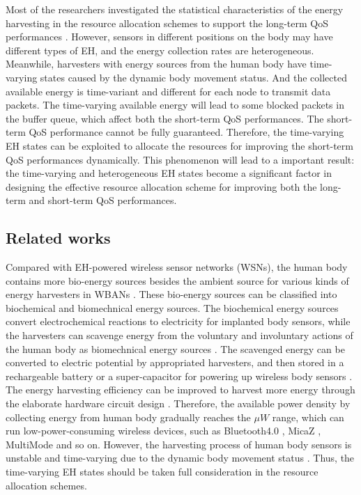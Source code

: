 \documentclass[journal,10pt]{IEEEtran}
\begin{document}
Most of the researchers investigated the statistical characteristics of the energy harvesting in the resource allocation schemes to support the long-term QoS performances \cite{ibarra2016qos,ozel2011transmission,leng2017resource}. 
However, sensors in different positions on the body may have different types of EH, and the energy collection rates are heterogeneous. Meanwhile, harvesters with energy sources from the human body have time-varying states caused by the dynamic body movement status. And the collected available energy is time-variant and different for each node to transmit data packets. 
The time-varying available energy will lead to some blocked packets in the buffer queue, which affect both the short-term QoS performances. The short-term QoS performance cannot be fully guaranteed.
Therefore, the time-varying EH states can be exploited to allocate the resources for improving the short-term QoS performances dynamically. This phenomenon will lead to a important result: the time-varying and heterogeneous EH states become a significant factor in designing the effective resource allocation scheme for improving both the long-term and short-term QoS performances. 

\subsection{Related works}
Compared with EH-powered wireless sensor networks (WSNs), the human body contains more bio-energy sources besides the ambient source for various kinds of energy harvesters in WBANs \cite{leng2017resource}. These bio-energy sources can be classified into biochemical and biomechnical energy sources. The biochemical energy sources convert electrochemical reactions to electricity for implanted body sensors, while the harvesters can scavenge energy from the voluntary and involuntary actions of the human body as biomechnical energy sources \cite{akhtar2017energy}. The scavenged energy can be converted to electric potential by appropriated harvesters, and then stored in a rechargeable battery or a super-capacitor for powering up wireless body sensors \cite{wahbah2014characterization}. The energy harvesting efficiency can be improved to harvest more energy through the elaborate hardware circuit design \cite{xia20140,el201610}. Therefore, the available power density by collecting energy from human body gradually reaches the $\mu W$ range, which can run low-power-consuming wireless devices, such as Bluetooth4.0 \cite{bluetooth2010}, MicaZ \cite{kramer2006energy}, MultiMode \cite{wong20131} and so on. However, the harvesting process of human body sensors is unstable and time-varying due to the dynamic body movement status \cite{hao2017energy}. Thus, the time-varying EH states should be taken full consideration in the resource allocation schemes.
\end{document}
